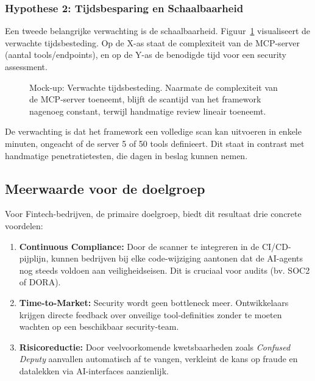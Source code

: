 \subsubsection{Hypothese 2: Tijdsbesparing en Schaalbaarheid}
Een tweede belangrijke verwachting is de schaalbaarheid. Figuur~\ref{fig:mockup_tijd} visualiseert de verwachte tijdsbesteding. Op de X-as staat de complexiteit van de MCP-server (aantal tools/endpoints), en op de Y-as de benodigde tijd voor een security assessment.

\begin{figure}[htbp]
    \centering
    \caption{Mock-up: Verwachte tijdsbesteding. Naarmate de complexiteit van de MCP-server toeneemt, blijft de scantijd van het framework nagenoeg constant, terwijl handmatige review lineair toeneemt.}
    \label{fig:mockup_tijd}
\end{figure}

De verwachting is dat het framework een volledige scan kan uitvoeren in enkele minuten, ongeacht of de server 5 of 50 tools definieert. Dit staat in contrast met handmatige penetratietesten, die dagen in beslag kunnen nemen.

\subsection{Meerwaarde voor de doelgroep}

Voor Fintech-bedrijven, de primaire doelgroep, biedt dit resultaat drie concrete voordelen:
\begin{enumerate}
    \item \textbf{Continuous Compliance:} Door de scanner te integreren in de CI/CD-pijplijn, kunnen bedrijven bij elke code-wijziging aantonen dat de AI-agents nog steeds voldoen aan veiligheidseisen. Dit is cruciaal voor audits (bv. SOC2 of DORA).
    \item \textbf{Time-to-Market:} Security wordt geen bottleneck meer. Ontwikkelaars krijgen directe feedback over onveilige tool-definities zonder te moeten wachten op een beschikbaar security-team.
    \item \textbf{Risicoreductie:} Door veelvoorkomende kwetsbaarheden zoals \emph{Confused Deputy} aanvallen automatisch af te vangen, verkleint de kans op fraude en datalekken via AI-interfaces aanzienlijk.
\end{enumerate}

